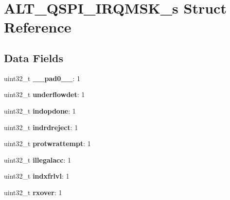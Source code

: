 \hypertarget{structALT__QSPI__IRQMSK__s}{}\section{A\+L\+T\+\_\+\+Q\+S\+P\+I\+\_\+\+I\+R\+Q\+M\+S\+K\+\_\+s Struct Reference}
\label{structALT__QSPI__IRQMSK__s}
\subsection*{Data Fields}
\begin{DoxyCompactItemize}
\item 
\mbox{\label{structALT__QSPI__IRQMSK__s_a260cdcb9e647416f8e9288f4fb8f1a8b}} 
uint32\+\_\+t {\bfseries \+\_\+\+\_\+pad0\+\_\+\+\_\+}\+: 1
\item 
\mbox{\label{structALT__QSPI__IRQMSK__s_a06460b4363ca9a4eb8c7eab888589999}} 
uint32\+\_\+t {\bfseries underflowdet}\+: 1
\item 
\mbox{\label{structALT__QSPI__IRQMSK__s_a3c4d17f86679c7fc54a534e8af43d639}} 
uint32\+\_\+t {\bfseries indopdone}\+: 1
\item 
\mbox{\label{structALT__QSPI__IRQMSK__s_a9b96cccc60b41527c3dbcf3c9abda542}} 
uint32\+\_\+t {\bfseries indrdreject}\+: 1
\item 
\mbox{\label{structALT__QSPI__IRQMSK__s_ae5519752d062a8624a1674bd5b2b0b59}} 
uint32\+\_\+t {\bfseries protwrattempt}\+: 1
\item 
\mbox{\label{structALT__QSPI__IRQMSK__s_a92cede9cf9b0ea5fdbfc3c4ec95d6adc}} 
uint32\+\_\+t {\bfseries illegalacc}\+: 1
\item 
\mbox{\label{structALT__QSPI__IRQMSK__s_a59f8c98e3cb82534b62dcb9069dc0bca}} 
uint32\+\_\+t {\bfseries indxfrlvl}\+: 1
\item 
\mbox{\label{structALT__QSPI__IRQMSK__s_af361f4a4d4acf14c7ff1682c4b6c6a5f}} 
uint32\+\_\+t {\bfseries rxover}\+: 1
\item 

\end{DoxyCompactItemize}
